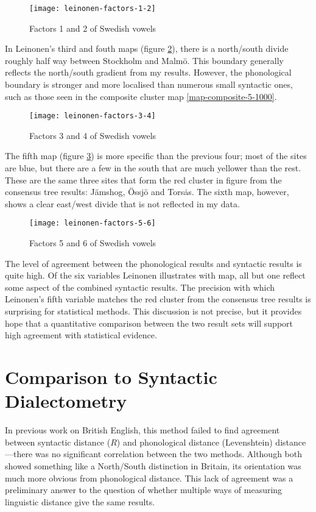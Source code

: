 \begin{figure}
  \texttt{[image: leinonen-factors-1-2]}
  \caption{Factors 1 and 2 of Swedish vowels}
  \label{leinonen-factors-1-2}
\end{figure}

In Leinonen's third and fouth maps (figure \ref{leinonen-factors-3-4}),
there is a north/south divide roughly half way between Stockholm and
Malm\"o. This boundary generally reflects the north/south
gradient from my results. However, the phonological boundary is stronger and more
localised than numerous small syntactic ones, such as those seen in
the composite cluster map \ref{map-composite-5-1000}.

\begin{figure}
  \texttt{[image: leinonen-factors-3-4]}
  \caption{Factors 3 and 4 of Swedish vowels}
  \label{leinonen-factors-3-4}
\end{figure}


The fifth map (figure \ref{leinonen-factors-5-6}) is more specific
than the previous four; most of the sites are blue, but there are a
few in the south that are much yellower than the rest. These are the
same three sites that form the red cluster in
figure \label{red-cluster} from the consensus tree
results: J\"amshog, \"Ossj\"o and Tors\.as. The sixth map, however,
shows a clear east/west divide that is not reflected in my data.

\begin{figure}
  \texttt{[image: leinonen-factors-5-6]}
  \caption{Factors 5 and 6 of Swedish vowels}
  \label{leinonen-factors-5-6}
\end{figure}

The level of agreement between the phonological results and syntactic
results is quite high. Of the six variables Leinonen illustrates with
map, all but one reflect some aspect of the combined syntactic
results. The precision with which Leinonen's fifth variable matches
the red cluster from the consensus tree results is surprising for
statistical methods. This discussion is not precise, but it provides
hope that a quantitative comparison between the two result sets will
support high agreement with statistical evidence.

\section{Comparison to Syntactic Dialectometry}

In previous work on British English, this method failed to find
agreement between syntactic distance ($R$) and phonological distance
(Levenshtein) distance---there was no
significant correlation between the two methods. Although both showed
something like a North/South distinction in Britain, its orientation was much more
obvious from phonological distance. This lack of agreement was a
preliminary answer to the question of whether multiple
ways of measuring linguistic distance give the same results.

